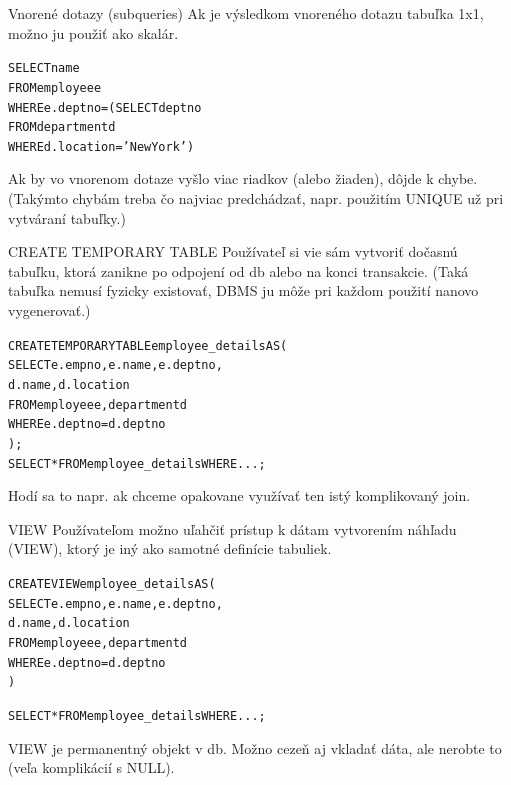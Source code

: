 \documentclass[12pt]{beamer}
\def\blue#1{\textcolor{Cerulean}{#1}}
\begin{document}
\begin{frame}[fragile]{Vnorené dotazy (subqueries)}
Ak je výsledkom vnoreného dotazu tabuľka 1x1, možno ju použiť ako skalár.
\begin{alltt}
SELECT name
FROM employee e
WHERE \alert{e.deptno =} \blue{(SELECT deptno
                  FROM department d
                  WHERE d.location = 'New York')}
\end{alltt}
Ak by vo vnorenom dotaze vyšlo viac riadkov (alebo žiaden), dôjde k chybe.\\
(Takýmto chybám treba čo najviac predchádzať, napr. použitím UNIQUE už pri vytváraní tabuľky.)
\end{frame}

\begin{frame}[fragile]{CREATE TEMPORARY TABLE}
Používateľ si vie sám vytvoriť dočasnú tabuľku, ktorá zanikne po odpojení od db alebo na konci transakcie.
(Taká tabuľka nemusí fyzicky existovať, DBMS ju môže pri každom použití nanovo vygenerovať.)
\begin{alltt}
\alert{CREATE TEMPORARY TABLE} \blue{employee_details} AS (
    SELECT e.empno, e.name, e.deptno,
           d.name, d.location
    FROM employee e, department d
    WHERE e.deptno = d.deptno
);
SELECT * FROM \blue{employee_details} WHERE ...;
\end{alltt}
Hodí sa to napr. ak chceme opakovane využívať ten istý komplikovaný join.
\end{frame}


\begin{frame}[fragile]{VIEW}
Používateľom možno uľahčiť prístup k dátam vytvorením náhľadu (VIEW), ktorý je iný ako samotné definície tabuliek.
\begin{alltt}
\alert{CREATE VIEW} \blue{employee_details} AS (
    SELECT e.empno, e.name, e.deptno,
           d.name, d.location
    FROM employee e, department d
    WHERE e.deptno = d.deptno
)

SELECT * FROM \blue{employee_details} WHERE ...;
\end{alltt}
VIEW je permanentný objekt v db. Možno cezeň aj vkladať dáta, ale nerobte to (veľa komplikácií s NULL).
\end{frame}
\end{document}
